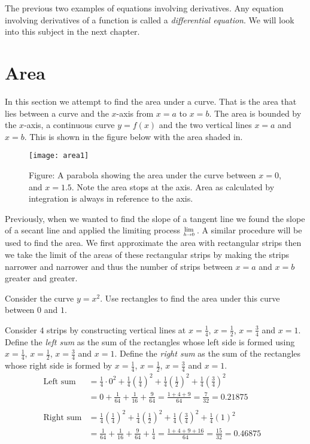 The previous two examples of equations involving derivatives. Any equation involving derivatives of a function is called a \emph{differential equation}. We will look into this subject in the next chapter. 

 
\section{Area}
In this section we attempt to find the area under a curve. That is the area that lies between a curve and the $x$-axis from $x =a$ to $x =b$. The area is bounded by the $x$-axis, a continuous curve $y =f (x)$ and the two vertical lines $x =a$ and $x =b$. This is shown in the figure below with the area shaded in.
\begin{SCfigure}[1][h]
	\texttt{[image: area1]}
	\caption*{Figure: A parabola showing the area under the curve between $x=0$, and $x=1.5$. Note the area stops at the axis. Area as calculated by integration is always in reference to the axis.}
\end{SCfigure}

Previously, when we wanted to find the slope of a tangent line we found the slope of a secant line and applied the limiting process $\Lim{h\to 0}$. A similar procedure will be used to find the area. We first approximate the area with rectangular strips then we take the limit of the areas of these rectangular strips by making the strips narrower and narrower and thus the number of strips between $x =a$ and $x =b$ greater and greater. 

\example Consider the curve $y =x^{2}$. Use rectangles to find the area under this curve between $0$ and $1$. 

\solution Consider $4$ strips by constructing vertical lines at $x =\frac{1}{4}$, $x =\frac{1}{2}$, $x =\frac{3}{4}$ and $x =1$. Define the \emph{left sum} as the sum of the rectangles whose
left side is formed using $x =\frac{1}{4}$, $x =\frac{1}{2}$, $x =\frac{3}{4}$ and $x =1$. Define the \emph{right sum} as the sum of the rectangles whose
right side is formed by $x =\frac{1}{4}$, $x =\frac{1}{2}$, $x =\frac{3}{4}$ and $x =1$.
\begin{align*}\text{Left sum} &  = \frac{1}{4} \cdot 0^{2} +\frac{1}{4} \genfrac{(}{)}{}{}{1}{4}^{2} +\frac{1}{4} \genfrac{(}{)}{}{}{1}{2}^{2} +\frac{1}{4} \genfrac{(}{)}{}{}{3}{4}^{2} \\
 &  = 0 +\frac{1}{64} +\frac{1}{16} +\frac{9}{64} =\frac{1 +4 +9}{64} =\frac{7}{32} =0.21875 \\
\, &  &  \\
\text{Right sum} &  = \frac{1}{4} \genfrac{(}{)}{}{}{1}{4}^{2} +\frac{1}{4} \genfrac{(}{)}{}{}{1}{2}^{2} +\frac{1}{4} \genfrac{(}{)}{}{}{3}{4}^{2} +\frac{1}{4} \left (1\right )^{2} \\
 &  = \frac{1}{64} +\frac{1}{16} +\frac{9}{64} +\frac{1}{4} =\frac{1 +4 +9 +16}{64} =\frac{15}{32} =0.46875\end{align*}

